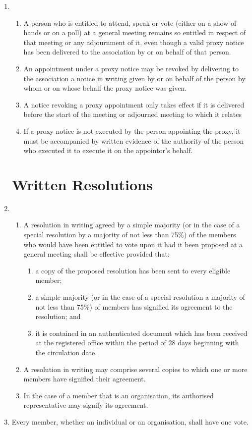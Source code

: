 \begin{enumerate}
\item
    \begin{enumerate}
        \item
        A person who is entitled to attend, speak or vote
        (either on a show of hands or on a poll) at a general meeting
        remains so entitled in respect of that meeting or any adjournment
        of it, even though a valid proxy notice has been delivered to the
        association by or on behalf of that person.
        \item
        An appointment under a
        proxy notice may be revoked by delivering to the association a notice
        in writing given by or on behalf of the person by whom or on whose
        behalf the proxy notice was given. 
        \item
        A notice revoking a proxy
        appointment only takes effect if it is delivered before the start
        of the meeting or adjourned meeting to which it relates 
        \item
        If a
        proxy notice is not executed by the person appointing the proxy, it
        must be accompanied by written evidence of the authority of the
        person who executed it to execute it on the appointor's behalf.
    \end{enumerate}

\section{Written Resolutions}

\item
  \begin{enumerate}
  \item
    A resolution in writing agreed by a simple majority (or in the case
    of a special resolution by a majority of not less than 75\%) of the
    members who would have been entitled to vote upon it had it been
    proposed at a general meeting shall be effective provided that:
    \begin{enumerate}
    \item
      a copy of the proposed resolution has been sent to every eligible
      member;
    \item
      a simple majority (or in the case of a special resolution a
      majority of not less than 75\%) of members has signified its
      agreement to the resolution; and
    \item
      it is contained in an authenticated document which has been
      received at the registered office within the period of 28 days
      beginning with the circulation date.
    \end{enumerate}
  \item
    A resolution in writing may comprise several copies to which one or
    more members have signified their agreement.
  \item
    In the case of a member that is an organisation, its authorised
    representative may signify its agreement.
  \end{enumerate}
\item
  Every member, whether an individual or an organisation, shall have one vote.


\end{enumerate}
